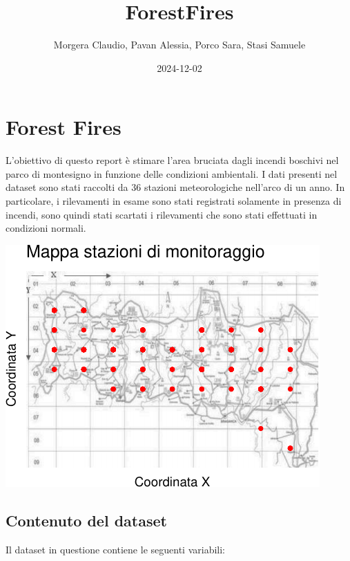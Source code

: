 \documentclass[
]{article}
\title{ForestFires}
\author{Morgera Claudio, Pavan Alessia, Porco Sara, Stasi Samuele}
\date{2024-12-02}
\begin{document}
\maketitle

\section{Forest Fires}\label{forest-fires}

L'obiettivo di questo report è stimare l'area bruciata dagli incendi
boschivi nel parco di montesigno in funzione delle condizioni
ambientali. I dati presenti nel dataset sono stati raccolti da 36
stazioni meteorologiche nell'arco di un anno. In particolare, i
rilevamenti in esame sono stati registrati solamente in presenza di
incendi, sono quindi stati scartati i rilevamenti che sono stati
effettuati in condizioni normali. \newline

\begin{center}\includegraphics{ForestFires_files/figure-latex/mappa-1} \end{center}

\subsection{Contenuto del dataset}\label{contenuto-del-dataset}

Il dataset in questione contiene le seguenti variabili:
\end{document}
